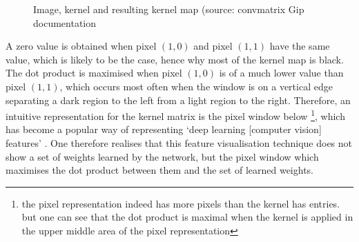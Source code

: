 \documentclass[a4paper,11pt]{article}
\begin{document}
\begin{figure}[h]
    \caption{Image, kernel and resulting kernel map (source: convmatrix Gip documentation}
    \label{materialflowChart}
\end{figure}

A zero value is obtained when pixel $(1,0)$ and pixel $(1,1)$ have the same value, which is likely to be the case, hence why most of the kernel map is black. The dot product is maximised when pixel $(1,0)$ is of a much lower value than pixel $(1,1)$, which occurs most often when the window is on a vertical edge separating a dark region to the left from a light region to the right. Therefore, an intuitive representation for the kernel matrix is the pixel window below \footnote{the pixel representation indeed has more pixels than the kernel has entries. but one can see that the dot product is maximal when the kernel is applied in the upper middle area of the pixel representation}, which has become a popular way of representing `deep learning [computer vision] features' \cite{zeiler_fergus}. One therefore realises that this feature visualisation technique does not show a set of weights learned by the network, but the pixel window which maximises the dot product between them and the set of learned weights.
\end{document}
